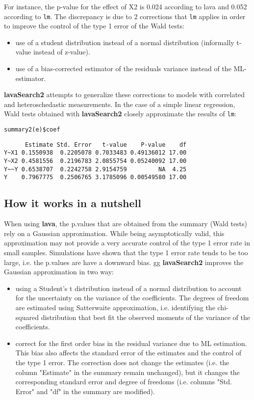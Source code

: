 \documentclass[12pt]{article}
\begin{document}
For instance, the p-value for the effect of X2 is 0.024 according to
lava and 0.052 according to \texttt{lm}. The discrepancy is due to 2
corrections that \texttt{lm} applies in order to improve the control of the
type 1 error of the Wald tests:
\begin{itemize}
\item use of a student distribution instead of a normal distribution
(informally t-value instead of z-value).
\item use of a bias-corrected estimator of the residuals variance instead
of the ML-estimator.
\end{itemize}
\textbf{lavaSearch2} attempts to generalize these corrections to models with
correlated and heteroschedastic measurements. In the case of a simple
linear regression, Wald tests obtained with \textbf{lavaSearch2} closely
approximate the results of \texttt{lm}:
\lstset{language=r,label= ,caption= ,captionpos=b,numbers=none}
\begin{lstlisting}
summary2(e)$coef
\end{lstlisting}

\begin{verbatim}
      Estimate Std. Error   t-value    P-value    df
Y~X1 0.1550938  0.2205078 0.7033483 0.49136012 17.00
Y~X2 0.4581556  0.2196783 2.0855754 0.05240092 17.00
Y~~Y 0.6538707  0.2242758 2.9154759         NA  4.25
Y    0.7967775  0.2506765 3.1785096 0.00549580 17.00
\end{verbatim}

\subsection{How it works in a nutshell}
\label{sec:orgb76b07a}

When using \textbf{lava}, the p.values that are obtained from the summary
(Wald tests) rely on a Gaussian approximation. While being
asymptotically valid, this approximation may not provide a very
accurate control of the type 1 error rate in small
samples. Simulations have shown that the type 1 error rate tends to be
too large, i.e. the p.values are have a downward bias.  gg
\textbf{lavaSearch2} improves the Gaussian approximation in two way:
\begin{itemize}
\item using a Student's t distribution instead of a normal distribution to
account for the uncertainty on the variance of the coefficients. The
degrees of freedom are estimated using Satterwaite approximation,
i.e. identifying the chi-squared distribution that best fit the
observed moments of the variance of the coefficients.
\item correct for the first order bias in the residual variance due to ML
estimation. This bias also affects the standard error of the
estimates and the control of the type 1 error. The correction does
not change the estimates (i.e. the column "Estimate" in the summary
remain unchanged), but it changes the corresponding standard error
and degree of freedoms (i.e. columns "Std. Error" and "df" in the
summary are modified).
\end{itemize}
\end{document}
